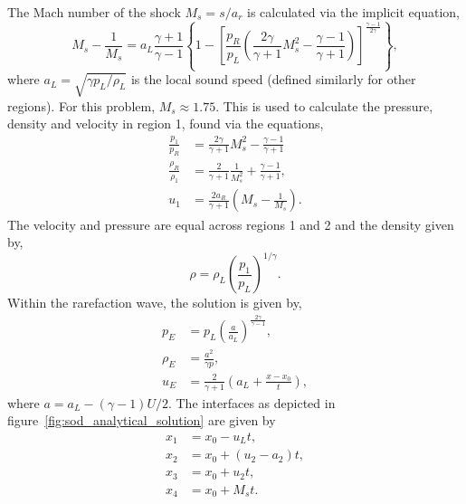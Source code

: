 The Mach number of the shock $M_s = s/a_r$ is calculated via the implicit equation,
\begin{equation}
  \label{eq:mach_shock}
M_s - \frac{1}{M_s} = a_L \frac{\gamma + 1}{\gamma - 1} \left\{
1 - \left[
\frac{p_R}{p_L} \left(
\frac{2\gamma}{\gamma +1}M_s^2 - \frac{\gamma - 1}{\gamma +1} 
\right)
\right]^{\frac{\gamma - 1}{2\gamma}}
\right\},
\end{equation}
where $a_L = \sqrt{\gamma p_L / \rho_L}$ is the local sound speed (defined similarly for other regions). For this problem, $M_s \approx 1.75$. This is used to calculate the pressure, density and velocity in region 1, found via the equations,
\begin{equation}
  \label{eq:sod_region1}
\begin{aligned}
\frac{p_1}{p_R} &= \frac{2\gamma}{\gamma + 1} M_s^2 - \frac{\gamma -1}{\gamma +1}\\
\frac{\rho_R}{\rho_1} &= \frac{2}{\gamma + 1} \frac{1}{M_s^2} + \frac{\gamma -1}{\gamma + 1},\\
u_1 &= \frac{2a_R}{\gamma + 1} \left( M_s - \frac{1}{M_s} \right).
\end{aligned}
\end{equation}
The velocity and pressure are equal across regions 1 and 2 and the density given by,
\begin{equation}
  \label{eq:sod_region2}
\rho = \rho_L \left( \frac{p_1}{p_L} \right)^{1/\gamma}.
\end{equation}
Within the rarefaction wave, the solution is given by,
\begin{equation}
  \label{eq:sod_regionE}
  \begin{aligned}
  p_E &= p_L \left( \frac{a}{a_L} \right)^{\frac{2\gamma}{\gamma-1}},\\
  \rho_E &= \frac{a^2}{\gamma p},\\
  u_E &= \frac{2}{\gamma +1} \left(a_L + \frac{x - x_0}{t}\right),
  \end{aligned}
\end{equation}
where $a = a_L - (\gamma-1)U/2$. The interfaces as depicted in figure~\ref{fig:sod_analytical_solution} are given by
\begin{equation}
  \label{eq:sod_interfaces}
\begin{aligned}
x_1 &= x_0 - u_L t,\\
x_2 &= x_0 + (u_2 - a_2)t, \\
x_3 &= x_0 + u_2 t, \\
x_4 &= x_0 + M_s t.
\end{aligned}
\end{equation}

